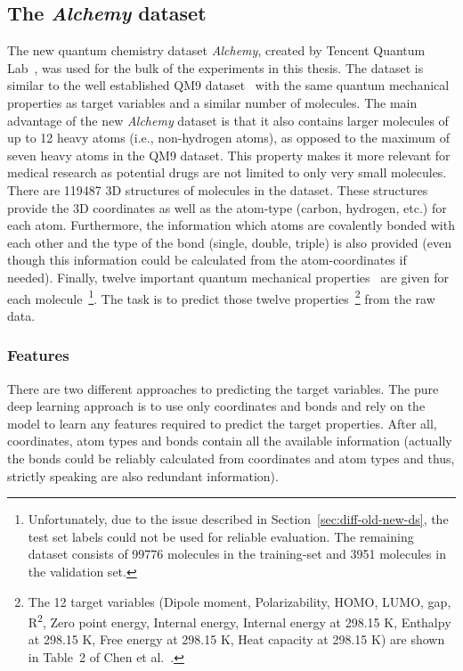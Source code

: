 \subsection{The \textit{Alchemy} dataset}
\label{sec:alchemy-dataset}
The new quantum chemistry dataset \textit{Alchemy}, created by Tencent Quantum Lab~\cite{Chen2019}, was used for the bulk of the experiments in this thesis. The dataset is similar to the well established QM9 dataset~\cite{Ramakrishnan2014} with the same quantum mechanical properties as target variables and a similar number of molecules. The main advantage of the new \textit{Alchemy} dataset is that it also contains larger molecules of up to 12 heavy atoms (i.e., non-hydrogen atoms), as opposed to the maximum of seven heavy atoms in the QM9 dataset. This property makes it more relevant for medical research as potential drugs are not limited to only very small molecules. 
There are 119487 3D structures of molecules in the dataset. These structures provide the 3D coordinates as well as the atom-type (carbon, hydrogen, etc.) for each atom. Furthermore, the information which atoms are covalently bonded with each other and the type of the bond (single, double, triple) is also provided (even though this information could be calculated from the atom-coordinates if needed). Finally, twelve important quantum mechanical properties~\cite{Chen2019} are given for each molecule~\footnote{
	Unfortunately, due to the issue described in Section~\ref{sec:diff-old-new-ds}, the test set labels could not be used for reliable evaluation. The remaining dataset consists of 99776 molecules in the training-set and 3951 molecules in the validation set.
}. The task is to predict those twelve properties~\footnote{
	The 12 target variables
	(Dipole moment, Polarizability, HOMO, LUMO, gap, R\textsuperscript2, Zero point energy, Internal energy, Internal energy at 298.15 K, Enthalpy at 298.15 K, Free energy at 298.15 K, Heat capacity at 298.15 K) are shown in Table~2 of Chen et al.~\cite{Chen2019}.
} from the raw data.




\subsubsection{Features}
\label{sec:features}

There are two different approaches to predicting the target variables. The pure deep learning approach is to use only coordinates and bonds and rely on the model to learn any features required to predict the target properties. After all, coordinates, atom types and bonds contain all the available information (actually the bonds could be reliably calculated from coordinates and atom types and thus, strictly speaking are also redundant information).

